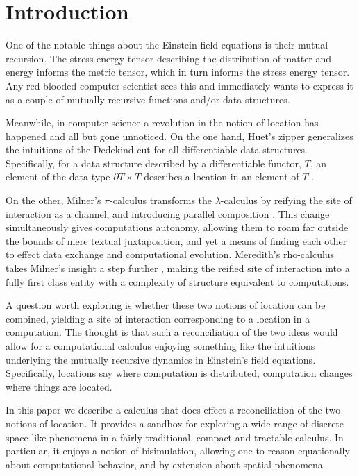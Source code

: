 \section{Introduction}\label{sec:introduction} %

One of the notable things about the Einstein field equations
\cite{Misner1973} is their mutual recursion. The stress energy tensor
describing the distribution of matter and energy informs the metric
tensor, which in turn informs the stress energy tensor. Any red
blooded computer scientist sees this and immediately wants to express
it as a couple of mutually recursive functions and/or data structures.

Meanwhile, in computer science a revolution in the notion of location
has happened and all but gone unnoticed. On the one hand, Huet's
zipper \cite{DBLP:journals/jfp/Huet97} generalizes the intuitions of
the Dedekind cut for all differentiable data structures. Specifically,
for a data structure described by a differentiable functor, $T$, an
element of the data type $\partial T \times T$ describes a location
in an element of $T$ \cite{DBLP:conf/popl/McBride08}.

On the other, Milner's $\pi$-calculus transforms the
$\lambda$-calculus by reifying the site of interaction as a channel,
and introducing parallel composition \cite{milner91polyadicpi}. This
change simultaneously gives computations autonomy, allowing them to
roam far outside the bounds of mere textual juxtaposition, and yet a
means of finding each other to effect data exchange and computational
evolution. Meredith's rho-calculus takes Milner's insight a step
further \cite{DBLP:journals/entcs/MeredithR05}, making the reified
site of interaction into a fully first class entity with a complexity
of structure equivalent to computations.

A question worth exploring is whether these two notions of location
can be combined, yielding a site of interaction corresponding to a
location in a computation. The thought is that such a reconciliation
of the two ideas would allow for a computational calculus enjoying
something like the intuitions underlying the mutually recursive
dynamics in Einstein's field equations. Specifically, locations say
where computation is distributed, computation changes where things are
located.

In this paper we describe a calculus that does effect a reconciliation
of the two notions of location. It provides a sandbox for exploring a
wide range of discrete space-like phenomena in a fairly traditional,
compact and tractable calculus. In particular, it enjoys a notion of
bisimulation, allowing one to reason equationally about computational
behavior, and by extension about spatial phenomena.

